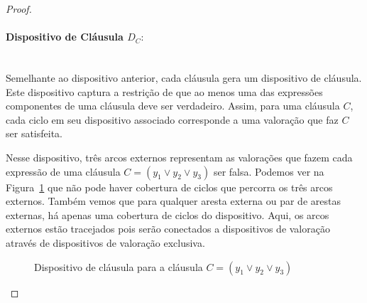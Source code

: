 \documentclass[paper=a4, fontsize=11pt]{scrartcl} %
\numberwithin{equation}{section} %
\numberwithin{figure}{section} %
\numberwithin{table}{section} %
\numberwithin{definition}{section}
\numberwithin{theorem}{section}
\begin{document}
\begin{proof}
\paragraph{Dispositivo de Cláusula $D_C:$} \hfill \\

Semelhante ao dispositivo anterior, cada cláusula gera um dispositivo de cláusula. Este dispositivo captura a restrição de que ao menos uma das expressões componentes de uma cláusula deve ser verdadeiro. Assim, para uma cláusula $C$, cada ciclo em seu dispositivo associado corresponde a uma valoração que faz $C$ ser satisfeita.

Nesse dispositivo, três arcos externos representam as valorações que fazem cada expressão de uma cláusula $C = (y_1 \lor y_2 \lor y_3)$ ser falsa. Podemos ver na Figura~\ref{fig:Dc} que não pode haver cobertura de ciclos que percorra os três arcos externos. Também vemos que para qualquer aresta externa ou par de arestas externas, há apenas uma cobertura de ciclos do dispositivo. Aqui, os arcos externos estão tracejados pois serão conectados a dispositivos de valoração através de dispositivos de valoração exclusiva.

\begin{figure}
\centering
{}
\caption{Dispositivo de cláusula para a cláusula $C = (y_1 \lor y_2 \lor y_3)$}
\label{fig:Dc}
\end{figure}
\FloatBarrier


\end{proof}
\end{document}
